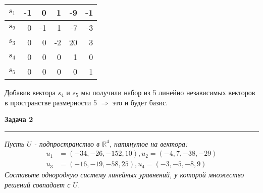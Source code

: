 \documentclass[10pt]{article}
\begin{document}
\begin{center}
	\begin{tabular}{ | r | r | r | r | r | r |}
		\hline
		$s_1$ & -1 & 0 & 1 & -9 & -1 \\ \hline
		$s_2$ & 0 & -1 & 1 & -7 & -3 \\ \hline
		$s_3$ & 0 & 0 & -2 & 20 & 3 \\ \hline
		$s_4$ & 0 & 0 & 0 & 1 & 0 \\ \hline
		$s_5$ & 0 & 0 & 0 & 0 & 1 \\ \hline
	\end{tabular}
\end{center}
Добавив вектора $s_4 \text{ и } s_5$ мы получили набор из 5 линейно независимых векторов в пространстве размерности 5 $\Rightarrow$ это и будет базис.
\newpage












\textbf{\Large Задача 2}
\medskip\hrule\medskip 
\textsl{Пусть $U$ - подпространство в $\mathbb{R}^4$, натянутое на вектора: }
\begin{align*}
	u_1 &= (-34, -26, -152, 10), u_2 = (-4, 7, -38, -29) \\
	u_3 &= (-16, -19, -58, 25), u_4 = (-3, -5, -8, 9)
\end{align*}
\textsl{Составьте однородную систему линейных уравнений, у которой множество решений совпадает с $U$.} \\ 
\end{document}
